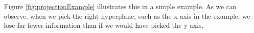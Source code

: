 Figure \ref{fig:projectionExample} illustrates this in a simple example.
As we can observe, when we pick the right \gls{hyperplane}, such as the x axis in the example, we lose far fewer information than if we would have picked the y axis.













